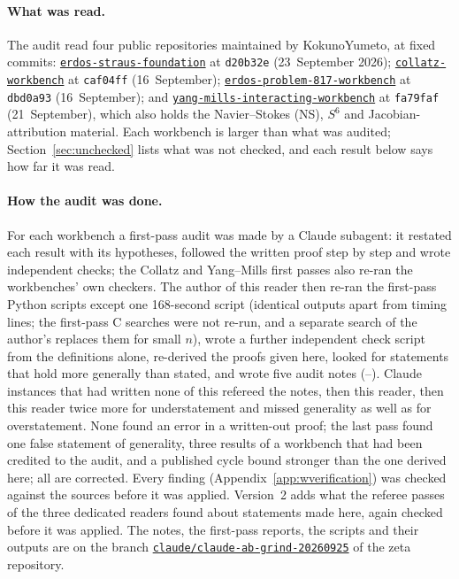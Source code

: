 \paragraph{What was read.}
The audit read four public repositories maintained by KokunoYumeto, at fixed commits:
\href{https://github.com/KokunoYumeto/erdos-straus-foundation}{\nolinkurl{erdos-straus-foundation}} at \texttt{d20b32e} (23~September 2026);
\href{https://github.com/KokunoYumeto/collatz-workbench}{\nolinkurl{collatz-workbench}} at \texttt{caf04ff} (16~September);
\href{https://github.com/KokunoYumeto/erdos-problem-817-workbench}{\nolinkurl{erdos-problem-817-workbench}} at \texttt{dbd0a93} (16~September);
and \href{https://github.com/KokunoYumeto/yang-mills-interacting-workbench}{\nolinkurl{yang-mills-interacting-workbench}} at \texttt{fa79faf} (21~September), which also holds the Navier--Stokes (NS), $S^6$ and Jacobian-attribution material.
Each workbench is larger than what was audited; Section~\ref{sec:unchecked} lists what was not checked, and each result below says how far it was read.

\paragraph{How the audit was done.}
For each workbench a first-pass audit was made by a Claude subagent: it restated each result with its hypotheses, followed the written proof step by step and wrote independent checks; the Collatz and Yang--Mills first passes also re-ran the workbenches' own checkers.
The author of this reader then re-ran the first-pass Python scripts except one 168-second script (identical outputs apart from timing lines; the first-pass C searches were not re-run, and a separate search of the author's replaces them for small $n$), wrote a further independent check script from the definitions alone, re-derived the proofs given here, looked for statements that hold more generally than stated, and wrote five audit notes (--).
Claude instances that had written none of this refereed the notes, then this reader, then this reader twice more for understatement and missed generality as well as for overstatement. None found an error in a written-out proof; the last pass found one false statement of generality, three results of a workbench that had been credited to the audit, and a published cycle bound stronger than the one derived here; all are corrected. Every finding (Appendix~\ref{app:wverification}) was checked against the sources before it was applied. Version~2 adds what the referee passes of the three dedicated readers found about statements made here, again checked before it was applied.
The notes, the first-pass reports, the scripts and their outputs are on the branch \href{https://github.com/KokunoYumeto/zeta-function-research-reader/tree/claude/claude-ab-grind-20260925/contrib/claude-ab/grind_20260925}{\nolinkurl{claude/claude-ab-grind-20260925}} of the zeta repository.

